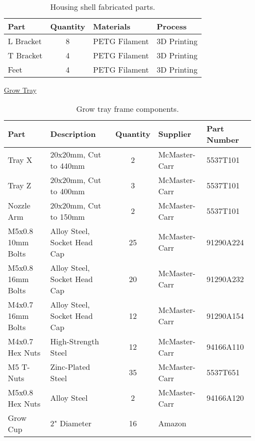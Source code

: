 \begin{table}[!ht]
    \centering
    \begin{tabular}{|l|c|l|l|}
    \hline
        Part        & Quantity  & Materials     & Process       \\ \hline
        L Bracket   & 8         & PETG Filament & 3D Printing   \\ \hline
        T Bracket   & 4         & PETG Filament & 3D Printing   \\ \hline
        Feet        & 4         & PETG Filament & 3D Printing   \\ \hline
    \end{tabular}
    \caption{Housing shell fabricated parts.}
    \label{tab:housing_shell_fabrication}
\end{table}

\clearpage

\uline{Grow Tray}
\begin{table}[!ht]
    \centering
    \begin{tabular}{|l|l|c|l|l|}
    \hline
        Part                & Description                   & Quantity  & Supplier          & Part Number   \\ \hline
        Tray X              & 20x20mm, Cut to 440mm         & 2         & McMaster-Carr     & 5537T101      \\ \hline
        Tray Z              & 20x20mm, Cut to 400mm         & 3         & McMaster-Carr     & 5537T101      \\ \hline
        Nozzle Arm          & 20x20mm, Cut to 150mm         & 2         & McMaster-Carr     & 5537T101      \\ \hline
        M5x0.8 10mm Bolts   & Alloy Steel, Socket Head Cap  & 25        & McMaster-Carr     & 91290A224     \\ \hline
        M5x0.8 16mm Bolts   & Alloy Steel, Socket Head Cap  & 20        & McMaster-Carr     & 91290A232     \\ \hline
        M4x0.7 16mm Bolts   & Alloy Steel, Socket Head Cap  & 12        & McMaster-Carr     & 91290A154     \\ \hline
        M4x0.7 Hex Nuts     & High-Strength Steel           & 12        & McMaster-Carr     & 94166A110     \\ \hline
        M5 T-Nuts           & Zinc-Plated Steel             & 35        & McMaster-Carr     & 5537T651      \\ \hline
        M5x0.8 Hex Nuts     & Alloy Steel                   & 2         & McMaster-Carr     & 94166A120     \\ \hline
        Grow Cup            & 2" Diameter                   & 16        & Amazon            & ~             \\ \hline
    \end{tabular}
    \caption{Grow tray frame components.}
    \label{tab:housing_parts}
\end{table}

